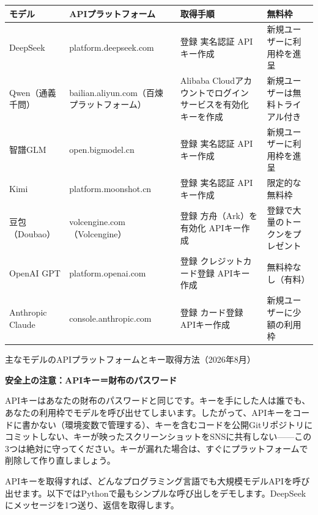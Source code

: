 \begin{center}
\begin{tabularx}{\linewidth}{|X|X|X|X|}
\hline
\textbf{モデル} & \textbf{APIプラットフォーム} & \textbf{取得手順} & \textbf{無料枠} \tabularnewline
\hline
DeepSeek & platform.deepseek.com & 登録 実名認証 APIキー作成 & 新規ユーザーに利用枠を進呈 \tabularnewline
Qwen（通義千問） & bailian.aliyun.com（百煉プラットフォーム） & Alibaba Cloudアカウントでログイン サービスを有効化 キーを作成 & 新規ユーザーは無料トライアル付き \tabularnewline
智譜GLM & open.bigmodel.cn & 登録 実名認証 APIキー作成 & 新規ユーザーに利用枠を進呈 \tabularnewline
Kimi & platform.moonshot.cn & 登録 実名認証 APIキー作成 & 限定的な無料枠 \tabularnewline
豆包（Doubao） & volcengine.com（Volcengine） & 登録 方舟（Ark）を有効化 APIキー作成 & 登録で大量のトークンをプレゼント \tabularnewline
OpenAI GPT & platform.openai.com & 登録 クレジットカード登録 APIキー作成 & 無料枠なし（有料） \tabularnewline
Anthropic Claude & console.anthropic.com & 登録 カード登録 APIキー作成 & 新規ユーザーに少額の利用枠 \tabularnewline
\hline
\end{tabularx}
\end{center}

\begin{center}\small\color{gray}主なモデルのAPIプラットフォームとキー取得方法（2026年8月）\end{center}

\textbf{安全上の注意：APIキー＝財布のパスワード}\par

APIキーはあなたの財布のパスワードと同じです。キーを手にした人は誰でも、あなたの利用枠でモデルを呼び出せてしまいます。したがって、APIキーをコードに書かない（環境変数で管理する）、キーを含むコードを公開Gitリポジトリにコミットしない、キーが映ったスクリーンショットをSNSに共有しない——この3つは絶対に守ってください。キーが漏れた場合は、すぐにプラットフォームで削除して作り直しましょう。


APIキーを取得すれば、どんなプログラミング言語でも大規模モデルAPIを呼び出せます。以下ではPythonで最もシンプルな呼び出しをデモします。DeepSeekにメッセージを1つ送り、返信を取得します。

